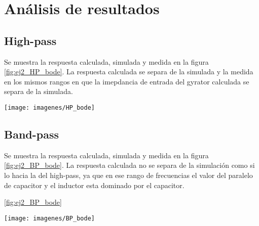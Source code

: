 \section{An\'alisis de resultados}

\subsection{High-pass}

Se muestra la respuesta calculada, simulada y medida en la figura \ref{fig:ej2_HP_bode}. La respuesta calculada se separa de la simulada y la medida en los mismos rangos en que la imepdancia de entrada del gyrator calculada se separa de la simulada.

\begin{figure*}
	\texttt{[image: imagenes/HP\_bode]}
	\caption{Respuesta en frecuencia del filtro high-pass calculada, simulada, y medida}
		\label{fig:ej2_HP_bode}
\end{figure*}



\subsection{Band-pass}

Se muestra la respuesta calculada, simulada y medida en la figura \ref{fig:ej2_BP_bode}. La respuesta calculada no se separa de la simulaci\'on como si lo hacia la del high-pass, ya que en ese rango de frecuencias el valor del paralelo de capacitor y el inductor esta dominado por el capacitor.

\ref{fig:ej2_BP_bode}
\begin{figure*}
	\texttt{[image: imagenes/BP\_bode]}
	\caption{Respuesta en frecuencia del filtro band-pass calculada, simulada, y medida}
		\label{fig:ej2_BP_bode}

\end{figure*}


